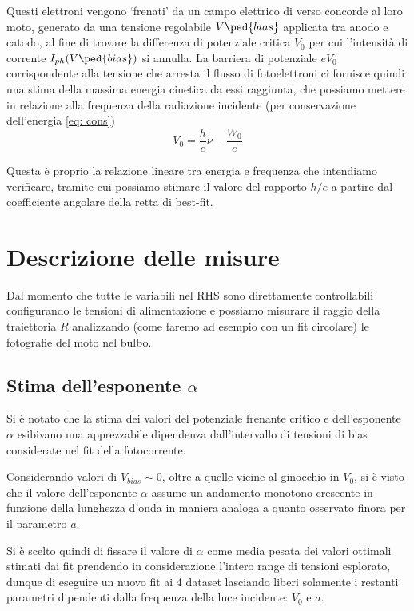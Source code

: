 \documentclass[10pt, a4paper, italian]{article}
\begin{document}
Questi elettroni vengono `frenati' da un campo elettrico di verso concorde al
loro moto, generato da una tensione regolabile $V\ped{bias}$ applicata tra
anodo e catodo, al fine di trovare la differenza di potenziale critica $V_0$
per cui l'intensità di corrente $I_{ph}(V\ped{bias})$ si annulla.
La barriera di potenziale $eV_0$ corrispondente alla tensione che arresta il
flusso di fotoelettroni ci fornisce quindi una stima della massima
energia cinetica da essi raggiunta, che possiamo mettere in relazione alla
frequenza della radiazione incidente (per conservazione dell'energia
\cref{eq: cons})
\begin{equation}\label{eq: V0}
V_0 = \frac{h}{e} \nu - \frac{W_0}{e}
\end{equation}

Questa è proprio la relazione lineare tra energia e frequenza che intendiamo
verificare, tramite cui possiamo stimare il valore del rapporto $h/e$ a
partire dal coefficiente angolare della retta di best-fit.

\section{Descrizione delle misure}
Dal momento che tutte le variabili nel RHS sono direttamente controllabili
configurando le tensioni di alimentazione e possiamo misurare il raggio
della traiettoria $R$ analizzando (come faremo ad esempio con un fit
circolare) le fotografie del moto nel bulbo.


\subsection{Stima dell'esponente $\alpha$}
Si è notato che la stima dei valori del potenziale frenante critico e
dell'esponente $\alpha$ esibivano una apprezzabile dipendenza dall'intervallo
di tensioni di bias considerate nel fit della fotocorrente.

Considerando valori di $V_{bias} \sim 0$, oltre
a quelle vicine al ginocchio in $V_{0}$, si è visto che il valore
dell'esponente $\alpha$ assume un andamento monotono crescente in funzione
della lunghezza d'onda in maniera analoga a quanto osservato finora per il
parametro $a$.

Si è scelto quindi di fissare il valore di $\alpha$ come media pesata dei
valori ottimali stimati dai fit prendendo in considerazione l'intero range di
tensioni esplorato, dunque di eseguire un nuovo fit ai 4 dataset lasciando
liberi solamente i restanti parametri dipendenti dalla frequenza della luce
incidente: $V_{0}$ e $a$.
\end{document}
